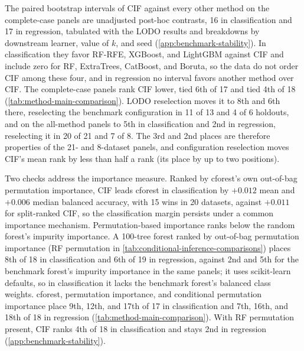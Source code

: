 The paired bootstrap intervals of CIF against every other method on the
complete-case panels are unadjusted post-hoc contrasts, 16 in classification
and 17 in regression, tabulated with the LODO results and breakdowns by
downstream learner, value of $k$, and seed (\cref{app:benchmark-stability}). In
classification they favor RF-RFE, XGBoost, and LightGBM against CIF and include
zero for RF, ExtraTrees, CatBoost, and Boruta, so the data do not order CIF
among these four, and in regression no interval favors another method over
CIF. The complete-case panels rank CIF lower, tied 6th of 17 and tied 4th of 18
(\cref{tab:method-main-comparison}). LODO reselection moves it to 8th and 6th there,
reselecting the benchmark configuration in 11 of 13 and 4 of 6 holdouts, and on
the all-method panels to 5th in classification and 2nd in regression,
reselecting it in 20 of 21 and 7 of 8. The 3rd and 2nd places are therefore
properties of the 21- and 8-dataset panels, and configuration reselection moves
CIF's mean rank by less than half a rank (its place by up to two positions).

Two checks address the importance measure. Ranked by cforest's own out-of-bag
permutation importance, CIF leads cforest in classification by $+0.012$ mean
and $+0.006$ median balanced accuracy, with 15 wins in 20 datasets, against
$+0.011$ for split-ranked CIF, so the classification margin persists under a
common importance mechanism. Permutation-based importance ranks below the random
forest's impurity importance. A 100-tree forest ranked by
out-of-bag permutation importance (RF permutation in
\cref{tab:conditional-inference-comparisons}) places 8th of 18 in classification
and 6th of 19 in regression, against 2nd and 5th for the benchmark forest's
impurity importance in the same panels; it uses scikit-learn defaults, so in
classification it lacks the benchmark forest's balanced class weights. cforest,
permutation importance, and conditional permutation importance place 9th, 12th,
and 17th of 17 in classification and 7th, 16th, and 18th of 18 in regression
(\cref{tab:method-main-comparison}). With RF permutation present, CIF ranks 4th
of 18 in classification and stays 2nd in regression
(\cref{app:benchmark-stability}).

